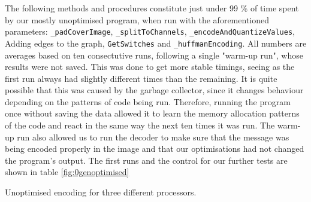 The following methods and procedures constitute just under 99 \% of time spent by our mostly unoptimised program, when run with the aforementioned parameters:
\lstinline|_padCoverImage|, \lstinline|_splitToChannels|, \lstinline|_encodeAndQuantizeValues|, Adding edges to the graph, \lstinline|GetSwitches| and \lstinline|_huffmanEncoding|.
All numbers are averages based on ten consectutive runs, following a single "warm-up run", whose results were not saved.
This was done to get more stable timings, seeing as the first run always had slightly different times than the remaining.
It is quite possible that this was caused by the garbage collector, since it changes behaviour depending on the patterns of code being run.
Therefore, running the program once without saving the data allowed it to learn the memory allocation patterns of the code and react in the same way the next ten times it was run.
The warm-up run also allowed us to run the decoder to make sure that the message was being encoded properly in the image and that our optimisations had not changed the program's output.
The first runs and the control for our further tests are shown in table \ref{fig:0genoptimised}

\begin{threeparttable}[]
    \centering
    \caption{Unoptimised encoding for three different processors.}
    \label{fig:0genoptimised}
\end{threeparttable}

